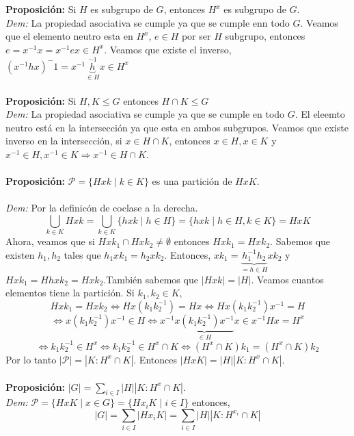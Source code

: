 \documentclass{article}
\begin{document}

\textbf{Proposición:} Si $H$ es subgrupo de $G$, entonces $H^x$ es subgrupo de $G$.\\
\textit{Dem:} La propiedad asociativa se cumple ya que se cumple enn todo $G$. Veamos que el elemento neutro esta en $H^x$, $e\in H$ por ser $H$ subgrupo, entonces $e=x^{-1}x=x^{-1}ex\in H^x$. Veamos que existe el inverso, $(x^{-1}hx)^-1=x^{-1}\underbrace{h}_{\in H}^{-1}x\in H^x$\\\\


\textbf{Proposición:} Si $H,K\le G$ entonces $H\cap K\le G$\\
\textit{Dem:} La propiedad asociativa se cumple ya que se cumple en todo $G$. El eleemto neutro está en la intersección ya que esta en ambos subgrupos. Veamos que existe inverso en la intersección, si $x\in H\cap K$, entonces $x\in H,x\in K$ y $x^{-1}\in H, x^{-1}\in K \Rightarrow x^{-1}\in H\cap K$.\\\\


\textbf{Proposición:} $\mathcal{P}=\{Hxk\mid k\in K\}$ es una partición de $HxK$.\\\\
\textit{Dem:} Por la definicón de coclase a la derecha.
$$
\bigcup_{k\in K} Hxk = \bigcup_{k\in K} \{ hxk\mid h\in H\} = \{ hxk\mid h\in H,k\in K\} = HxK
$$
Ahora, veamos que si $Hxk_1\cap Hxk_2 \ne \emptyset$ entonces $Hxk_1=Hxk_2$. Sabemos que existen $h_1,h_2$ tales que $h_1xk_1=h_2xk_2$. Entonces, $xk_1=\underbrace{h_1^{-1}h_2}_{=h\in H}xk_2$ y $Hxk_1=Hhxk_2=Hxk_2$.También sabemos que $|Hxk|=|H|$. Veamos cuantos elementos tiene la partición. Si $k_1,k_2\in K$,
$$
Hxk_1=Hxk_2 \Leftrightarrow
Hx(k_1k_2^{-1})=Hx \Leftrightarrow
Hx(k_1k_2^{-1})x^{-1}=H
$$
$$
\Leftrightarrow
x(k_1k_2^{-1})x^{-1}\in H \Leftrightarrow
x^{-1}\underbrace{x(k_1k_2^{-1})x^{-1}}_{\in H}x\in x^{-1}Hx=H^x
$$
$$
\Leftrightarrow
k_1k_2^{-1}\in H^x
\Leftrightarrow
k_1k_2^{-1}\in H^x\cap K
\Leftrightarrow
(H^x\cap K)k_1=(H^x\cap K)k_2
$$
Por lo tanto $|\mathcal{P}|=|K:H^x\cap K|$. Entonces $|HxK|=|H||K:H^x\cap K|$.\\\\


\textbf{Proposición:} $\displaystyle |G|=\sum_{i\in I} |H||K:H^x\cap K|$.\\
\textit{Dem:} $\mathcal{P}=\{HxK\mid x\in G\}=\{Hx_iK\mid i\in I\}$ entonces,
$$
|G| = \sum_{i\in I} |Hx_iK| = \sum_{i\in I} |H||K:H^{x_i}\cap K|
$$\\
\end{document}
